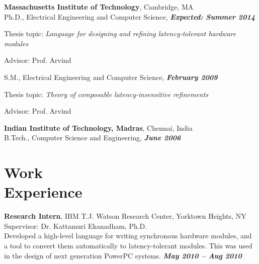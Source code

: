 \documentclass[margin,line]{resume}
\begin{document}
\begin{resume}
    \textbf{Massachusetts Institute of Technology}, Cambridge, MA \\
    \vspace{-2mm}
    Ph.D., Electrical Engineering and Computer Science, \hfill \textbf{\textit{Expected: Summer 2014}}\\
    \vspace{-2mm}
    \begin{list2}
        \item Thesis topic: \textit{Language for designing and refining latency-tolerant hardware modules}
        \item Advisor:  Prof. Arvind
    \end{list2}\vspace{-3mm}
    S.M., Electrical Engineering and Computer Science, \hfill \textbf{\textit{February 2009}}\\
    \vspace{-3mm}
    \begin{list2}
        \item Thesis topic: \textit{Theory of composable latency-insensitive refinements}
        \item Advisor:  Prof. Arvind
    \end{list2}\vspace{-3mm}
    \textbf{Indian Institute of Technology, Madras}, Chennai, India\\
    B.Tech., Computer Science and Engineering, \hfill \textbf{\textit{June 2006}}\\
    \vspace{-7mm}


    \section{\mysidestyle Work\\Experience}

    \textbf{Research Intern}, IBM T.J. Watson Research Center, Yorktown Heights, NY\\ 
    Supervisor: Dr. Kattamuri Ekanadham, Ph.D. \\
    Developed a high-level language for writing synchronous hardware modules,
    and a tool to convert them automatically to latency-tolerant modules. This
    was used in the design of next generation PowerPC systems. \hfill \textbf{\textit{May 2010 -- Aug 2010}}\\


\end{resume}
\end{document}
